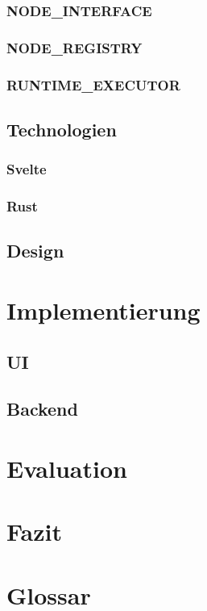 \documentclass[ngerman]{article}
\begin{document}
\subsubsection{NODE\_INTERFACE}
\subsubsection{NODE\_REGISTRY}
\subsubsection{RUNTIME\_EXECUTOR}
\subsection{Technologien}
\subsubsection{Svelte}
\subsubsection{Rust}
\subsection{Design}

\section{Implementierung}
\subsection{UI}
\subsection{Backend}

\section{Evaluation}
\section{Fazit}

\pagebreak
\section{Glossar}
\end{document}
